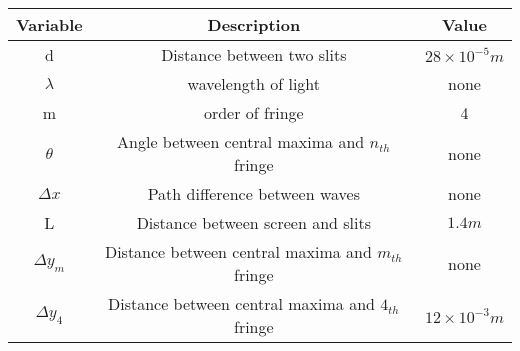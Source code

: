 \begin{tabular}{|c|c|c|}
    \hline
      \textbf{Variable}& \textbf{Description}& \textbf{Value}\\\hline
    d& Distance between two slits& $28 \times 10^{-5} m$ \\\hline
    $\lambda$& wavelength of light & none \\\hline
    m & order of fringe&4\\\hline
   $ \theta $& Angle between central maxima and $n_{th}$ fringe & none\\\hline
    $\Delta x $& Path difference between waves & none\\\hline
    L & Distance between screen and slits & $1.4m$\\\hline
    $\Delta y_m $& Distance between central maxima and $m_{th}$ fringe & none\\ 
    \hline
    $\Delta y_4 $& Distance between central maxima and $4_{th}$ fringe &$12\times 10^{-3}m$\\ 
    \hline
  \end{tabular}
